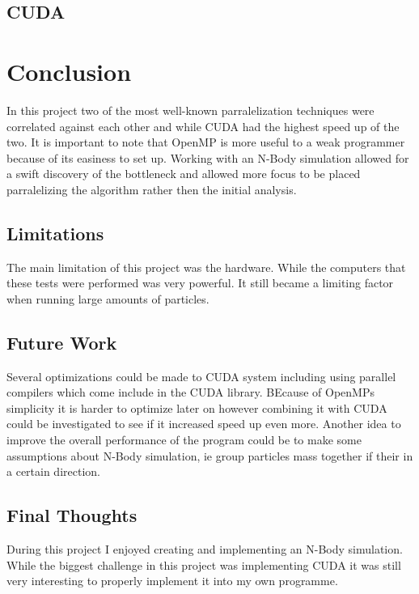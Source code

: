 \documentclass[12pt]{article}
\begin{document}
\subsection{CUDA}
\section{Conclusion}
In this project two of the most well-known parralelization techniques were correlated
against each other and while CUDA had the highest speed up of the two. It is important to note that OpenMP is more useful to a weak programmer because of its  easiness to set up. Working with an N-Body simulation allowed for a swift discovery of the bottleneck and allowed more focus to be placed parralelizing the algorithm rather then the initial analysis. 
\subsection{Limitations}
The main limitation of this project was the hardware. While the computers that these tests were performed was very powerful. It still became a limiting factor when running large amounts of particles.
\subsection{Future Work}
Several optimizations could be made to CUDA system including using parallel compilers which come include in the CUDA library. BEcause of OpenMPs simplicity it is harder to optimize later on however combining it with CUDA could be investigated to see if it increased speed up even more. Another idea to improve the overall performance of the program could be to make some assumptions about N-Body simulation, ie group particles mass together if their in a certain direction. 
\subsection{Final Thoughts}
During this project I enjoyed creating and implementing an N-Body simulation. While the biggest challenge in this project was implementing CUDA it was still very interesting to properly implement it into my own programme.

	
\end{document}
